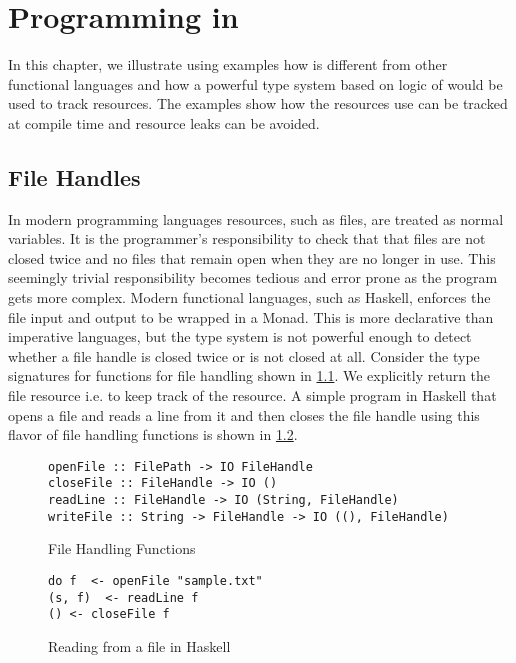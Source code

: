 \chapter{Programming in \qub{}}\label{chp:qub-programming}

In this chapter, we illustrate using examples how \qub{} is different
from other functional languages and how a powerful type system based on logic of \BI{}
would be used to track resources. The examples show how the resources use
can be tracked at compile time and resource leaks can be avoided.

\section{File Handles}\label{sec:file-handle-example}

In modern programming languages resources, such as files, are treated as normal variables.
It is the programmer's responsibility to check that that files are not closed twice
and no files that remain open when they are no longer in use. This seemingly trivial
responsibility becomes tedious and error prone as the program gets more complex.
Modern functional languages, such as Haskell, enforces the file input and output to be wrapped in a  Monad.
This is more declarative than imperative languages, but the type system is not powerful enough
to detect whether a file handle is closed twice or is not closed at all.
Consider the type signatures for functions for file handling shown in \cref{fig:file-handling-function}. We explicitly
return the file resource i.e.  to keep track of the resource.
A simple program in Haskell that opens a file and reads a line from it and then closes the file handle using this
flavor of file handling functions is shown in \cref{fig:file-read-close}.

\begin{figure}[h]
  \begin{framed}
\begin{verbatim}
openFile :: FilePath -> IO FileHandle
closeFile :: FileHandle -> IO ()
readLine :: FileHandle -> IO (String, FileHandle)
writeFile :: String -> FileHandle -> IO ((), FileHandle)
\end{verbatim}
  \end{framed}
  \caption{File Handling Functions}
  \label{fig:file-handling-function}
\end{figure}

\begin{figure}[h]
  \begin{framed}
\begin{verbatim}
do f  <- openFile "sample.txt"
(s, f)  <- readLine f
() <- closeFile f
\end{verbatim}
  \end{framed}
  \caption{Reading from a file in Haskell}
  \label{fig:file-read-close}
\end{figure}

